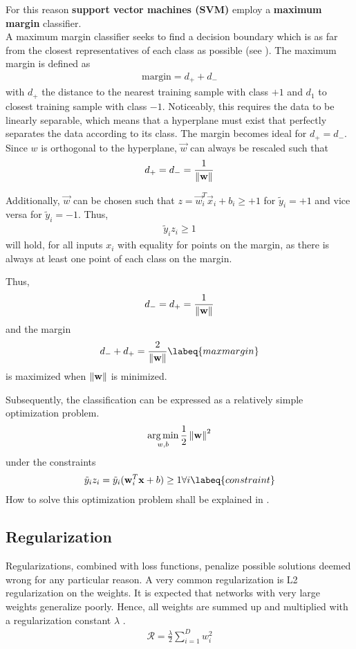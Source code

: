 For this reason \textbf{support vector machines (SVM)} employ a \textbf{maximum margin} classifier.\\
A maximum margin classifier seeks to find a decision boundary which is as far from the closest representatives of each class as possible (see ).
The maximum margin is defined as
\begin{align}
    \text{margin} = d_+ + d_-
\end{align}
with $d_+$ the distance to the nearest training sample with class $+1$ and $d_1$ to closest training sample with class $-1$.
Noticeably, this requires the data to be linearly separable, which means that a hyperplane must exist that perfectly separates the data according to its class.
The margin becomes ideal for $d_+ = d_-$.
Since $w$ is orthogonal to the hyperplane, $\vec{w}$ can always be rescaled such that 
\begin{align}
    d_+ = d_- = \frac{1}{\left\lVert\mathbf{w}\right\rVert}
\end{align}

Additionally, $\vec{w}$ can be chosen such that $z = \vec{w}_i^T \vec{x}_i + b_i \geq +1$ for $\tilde{y}_i = +1$ and vice versa for $\tilde{y}_i = -1$.
Thus,
\begin{align}
    \tilde{y}_i z_i \geq 1
\end{align}
will hold, for all inputs $x_i$ with equality for points on the margin, as there is always at least one point of each class on the margin.

Thus,
\begin{align}
    d_- = d_+ = \frac{1}{\left\lVert\mathbf{w}\right\rVert}
\end{align}
and the margin
\begin{align}
    d_- + d_+ = \frac{2}{\norm{\vec{w}}}
    \labeq{maxmargin}
\end{align}
is maximized when $\left\lVert\mathbf{w}\right\rVert$ is minimized.

Subsequently, the classification can be expressed as a relatively simple optimization problem.
\begin{align}
    \operatorname*{arg\,min}_{w, b} \frac{1}{2} \left\lVert\mathbf{w}\right\rVert^2
\end{align}
under the constraints
\begin{align}
    \tilde{y}_i z_i = \tilde{y}_i (\vec{w}_i^T \vec{x} + b) \geq 1 \forall i
    \labeq{constraint}
\end{align}
How to solve this optimization problem shall be explained in .

\subsection{Regularization}
Regularizations, combined with loss functions, penalize possible solutions deemed wrong for any particular reason.
A very common regularization is L2 regularization on the weights.
It is expected that networks with very large weights generalize poorly.
Hence, all weights are summed up and multiplied with a regularization constant $\lambda$ \cite{grosse}.
\begin{align}
	\mathcal{R} = \frac{\lambda}{2} \sum_{i = 1}^D w_i^2
\end{align}


